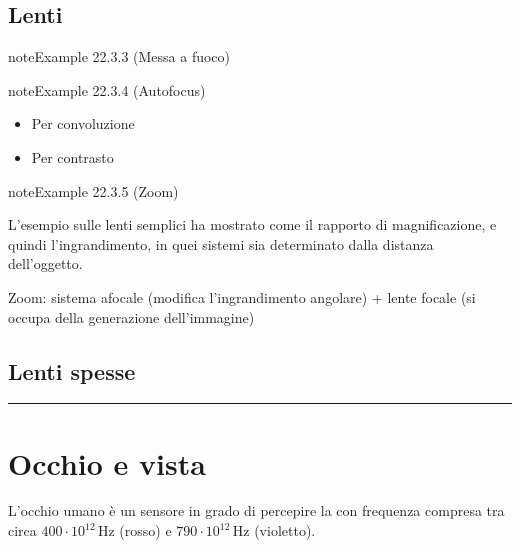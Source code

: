 \documentclass[letterpaper,10pt,italian]{jupyterBook}
\begin{document}
\subsection{Lenti}
\label{\detokenize{ch/waves/optics-lens:lenti}}\label{ch/waves/optics-lens:example-2}
\begin{sphinxadmonition}{note}{Example 22.3.3 (Messa a fuoco)}


\end{sphinxadmonition}
\label{ch/waves/optics-lens:example-3}
\begin{sphinxadmonition}{note}{Example 22.3.4 (Auto\sphinxhyphen{}focus)}


\begin{itemize}
\item {} 
\sphinxAtStartPar
Per convoluzione

\item {} 
\sphinxAtStartPar
Per contrasto

\end{itemize}
\end{sphinxadmonition}
\label{ch/waves/optics-lens:zoom}
\begin{sphinxadmonition}{note}{Example 22.3.5 (Zoom)}



\sphinxAtStartPar
L’esempio {\hyperref[\detokenize{ch/waves/optics-lens:lenses-simple}]{}} sulle lenti semplici ha mostrato come il rapporto di magnificazione, e quindi l’ingrandimento, in quei sistemi sia determinato dalla distanza dell’oggetto.

\sphinxAtStartPar
Zoom: sistema afocale (modifica l’ingrandimento angolare) + lente focale (si occupa della generazione dell’immagine)
\end{sphinxadmonition}


\subsection{Lenti spesse}
\label{\detokenize{ch/waves/optics-lens:lenti-spesse}}
\sphinxAtStartPar
{}


\bigskip\hrule\bigskip


\sphinxstepscope


\section{Occhio e vista}
\label{\detokenize{ch/waves/optics-eye:occhio-e-vista}}\label{\detokenize{ch/waves/optics-eye:physics-hs-waves-optics-eye}}\label{\detokenize{ch/waves/optics-eye::doc}}
\sphinxAtStartPar
L’occhio umano è un sensore in grado di percepire la {\hyperref[\detokenize{ch/electromagnetism/em-waves:physics-hs-electromagnetism-em-waves}]{}} con frequenza compresa tra circa \(400 \cdot 10^{12} \, \text{Hz}\) (rosso) e \(790 \cdot 10^{12} \, \text{Hz}\) (violetto).
\end{document}
